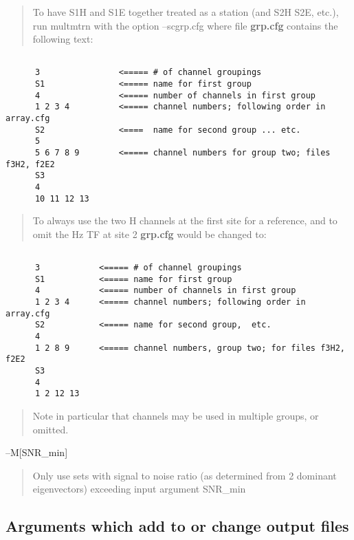 \begin{quote}
To have S1H and S1E together treated as a station (and S2H S2E, etc.), run multmtrn with the
option --scgrp.cfg  where file {\bf grp.cfg} contains the following text:
\end{quote}

\small
\begin{verbatim}

      3                <===== # of channel groupings
      S1               <===== name for first group
      4                <===== number of channels in first group
      1 2 3 4          <===== channel numbers; following order in array.cfg
      S2               <====  name for second group ... etc.
      5
      5 6 7 8 9        <===== channel numbers for group two; files f3H2, f2E2
      S3
      4
      10 11 12 13

\end{verbatim}
\normalsize
    
\begin{quote}
To always use the two H channels at the first site for a reference, and to omit the
Hz TF at site 2 {\bf grp.cfg} would be changed to:
\end{quote}

\small
\begin{verbatim}

      3            <===== # of channel groupings
      S1           <===== name for first group 
      4            <===== number of channels in first group  
      1 2 3 4      <===== channel numbers; following order in array.cfg 
      S2           <===== name for second group,  etc.
      4  
      1 2 8 9      <===== channel numbers, group two; for files f3H2, f2E2 
      S3 
      4 
      1 2 12 13 

\end{verbatim}
\normalsize

\begin{quote}
Note in particular that channels may be used in multiple groups, or omitted.
\end{quote}

--M[SNR\_min]
\begin{quote}
Only use sets with signal to noise ratio
(as determined from 2 dominant eigenvectors)
exceeding input argument SNR\_min
\end{quote}

\subsection{Arguments which add to or change output files}

